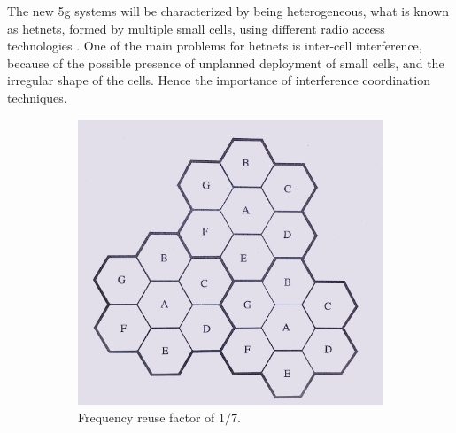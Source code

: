 The new \gls{5g} systems will be characterized by being heterogeneous, what is
known as \glspl{hetnet}, formed by multiple small cells, using different radio
access technologies \cite{chin14}. One of the main problems for \glspl{hetnet}
is inter-cell interference, because of the possible presence of unplanned
deployment of small cells, and the irregular shape of the cells. Hence the importance of interference coordination techniques.

\begin{figure}[t]
    \centering
    \begin{subfigure}[b]{0.45\textwidth}
            \includegraphics[width=\textwidth]{./01.introduction/img/frequency_reuse.png}
        \caption{Frequency reuse factor of $1 / 7$.}
        \label{fig:freuse}
    \end{subfigure}
    \begin{subfigure}[b]{0.45\textwidth}

\end{subfigure}
\end{figure}
